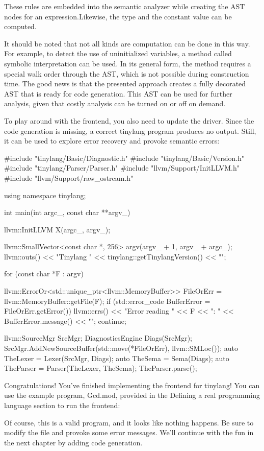 These rules are embedded into the semantic analyzer while creating the AST nodes for an expression.Likewise, the type and the constant value can be computed.

It should be noted that not all kinds are computation can be done in this way. For example, to detect the use of uninitialized variables, a method called symbolic interpretation can be used. In its general form, the method requires a special walk order through the AST, which is not possible during construction time. The good news is that the presented approach creates a fully decorated AST that is ready for code generation. This AST can be used for further analysis, given that costly analysis can be turned on or off on demand.

To play around with the frontend, you also need to update the driver. Since the code generation is missing, a correct tinylang program produces no output. Still, it can be used to explore error recovery and provoke semantic errors:

\begin{cpp}
#include "tinylang/Basic/Diagnostic.h"
#include "tinylang/Basic/Version.h"
#include "tinylang/Parser/Parser.h"
#include "llvm/Support/InitLLVM.h"
#include "llvm/Support/raw_ostream.h"

using namespace tinylang;

int main(int argc_, const char **argv_) {
    llvm::InitLLVM X(argc_, argv_);

    llvm::SmallVector<const char *, 256> argv(argv_ + 1,
                                              argv_ + argc_);
    llvm::outs() << "Tinylang "
                 << tinylang::getTinylangVersion() << "\n";

    for (const char *F : argv) {
        llvm::ErrorOr<std::unique_ptr<llvm::MemoryBuffer>>
            FileOrErr = llvm::MemoryBuffer::getFile(F);
        if (std::error_code BufferError =
                FileOrErr.getError()) {
            llvm::errs() << "Error reading " << F << ": "
                         << BufferError.message() << "\n";
            continue;
        }

        llvm::SourceMgr SrcMgr;
        DiagnosticsEngine Diags(SrcMgr);
        SrcMgr.AddNewSourceBuffer(std::move(*FileOrErr),
                                  llvm::SMLoc());
        auto TheLexer = Lexer(SrcMgr, Diags);
        auto TheSema = Sema(Diags);
        auto TheParser = Parser(TheLexer, TheSema);
        TheParser.parse();
    }
}
\end{cpp}

Congratulations! You’ve finished implementing the frontend for tinylang! You can use the example program, Gcd.mod, provided in the Defining a real programming language section to run the frontend:


Of course, this is a valid program, and it looks like nothing happens. Be sure to modify the file and provoke some error messages. We’ll continue with the fun in the next chapter by adding code generation.





